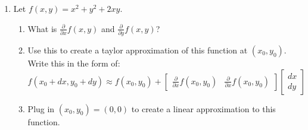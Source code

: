 \documentclass[12pt]{article}
\begin{document}
\begin{enumerate}
  \bigskip\bigskip
  \item Let $f(x, y) = x^2 + y^2 + 2xy$.
  \begin{enumerate}
    \item What is $\frac{\partial}{\partial x} f(x,y)$ and $\frac{\partial}{\partial y} f(x,y)$?
    
    \item Use this to create a taylor approximation of this function at $(x_0, y_0)$. Write this in the form of:
    $$
      f(x_0 + dx, y_0 + dy) \approx f(x_0, y_0) + \begin{bmatrix}\frac{\partial}{\partial x} f(x_0,y_0) & \frac{\partial}{\partial x} f(x_0,y_0)\end{bmatrix} \begin{bmatrix}dx \\ dy\end{bmatrix}
    $$

    \item Plug in $(x_0, y_0) = (0, 0)$ to create a linear approximation to this function.
  \end{enumerate}
\end{enumerate}
\end{document}
